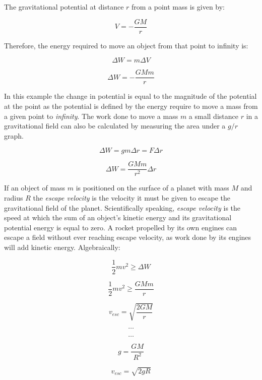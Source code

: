 \documentclass[12pt]{article}
\begin{document}
The gravitational potential at distance \(r\) from a point mass is given by:

\[V = - \dfrac{GM}{r}\]

Therefore, the energy required to move an object from that point to infinity is:

\[\Delta W = m \Delta V\]

\[\Delta W = - \dfrac{GMm}{r} \]

In this example the change in potential is equal to the magnitude of the potential at the point as the potential is defined by the energy require to move a mass from a given point to \emph{infinity}. The work done to move a mass \(m\) a small distance \(r\) in a gravitational field can also be calculated by measuring the area under a \(g/r\) graph.

\[\Delta W = gm \Delta r = F \Delta r  \]

\[ \Delta W = \dfrac{GMm}{r^2} \Delta r \]

If an object of mass \(m\) is positioned on the surface of a planet with mass \(M\) and radius \(R\) the \emph{escape velocity} is the velocity it must be given to escape the gravitational field of the planet. Scientifically speaking, \emph{escape velocity} is the speed at which the sum of an object's kinetic energy and its gravitational potential energy is equal to zero. A rocket propelled by its own engines can escape a field without ever reaching escape velocity, as work done by its engines will add kinetic energy. Algebraically:

\begin{figure}[H]
\centering
\begin{minipage}{.8\textwidth}
\begin{tcolorbox}[
sharp corners=all,
colback=white,
colframe=white,
size=tight,
boxrule=0.2mm,
left=10mm, right=10mm
]
\begin{multicols}{2}
\noindent

\[\dfrac{1}{2} m v^2 \ge \Delta W\]

\[\dfrac{1}{2} m v^2 \ge \dfrac{GMm}{r}\]

\[ v_{esc} = \sqrt{\dfrac{2GM}{r}}\]

\[\textbf{\ldots}\]
\columnbreak


\[\textbf{\ldots}\]

\[g = \dfrac{GM}{R^2}\]

\[ v_{esc} = \sqrt{2gR}\]
\\

\end{multicols}
\end{tcolorbox}
\end{minipage}
\end{figure}
\end{document}
